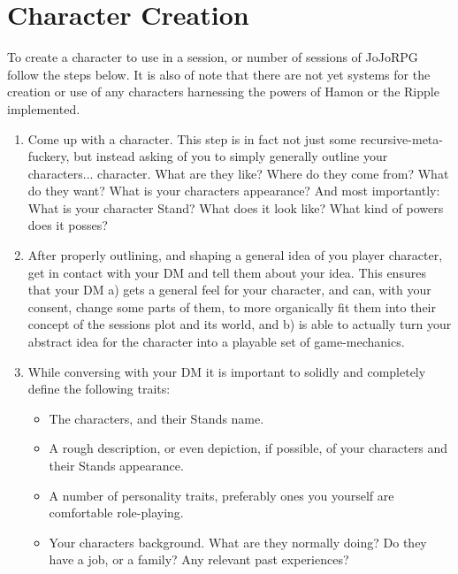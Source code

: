 \documentclass[a4paper,11pt]{article}
\begin{document}
\section{Character Creation}
To create a character to use in a session, or number of sessions of JoJoRPG follow the steps below. It is also of note that there are not yet systems for the creation or use of any characters harnessing the powers of Hamon or the Ripple implemented.
\begin{enumerate}
	\item Come up with a character. This step is in fact not just some recursive-meta-fuckery, but instead asking of you to simply generally outline your characters... character. What are they like? Where do they come from? What do they want? What is your characters appearance? And most importantly: What is your character Stand? What does it look like? What kind of powers does it posses?
	\item After properly outlining, and shaping a general idea of you player character, get in contact with your DM and tell them about your idea. This ensures that your DM a) gets a general feel for your character, and can, with your consent, change some parts of them, to more organically fit them into their concept of the sessions plot and its world, and b) is able to actually turn your abstract idea for the character into a playable set of game-mechanics.
	\item While conversing with your DM it is important to solidly and completely define the following traits:
	\begin{itemize}
		\item The characters, and their Stands name.
		\item A rough description, or even depiction, if possible, of your characters and their Stands appearance.
		\item A number of personality traits, preferably ones you yourself are comfortable role-playing.
		\item Your characters background. What are they normally doing? Do they have a job, or a family? Any relevant past experiences?

\end{itemize}
\end{enumerate}
\end{document}
